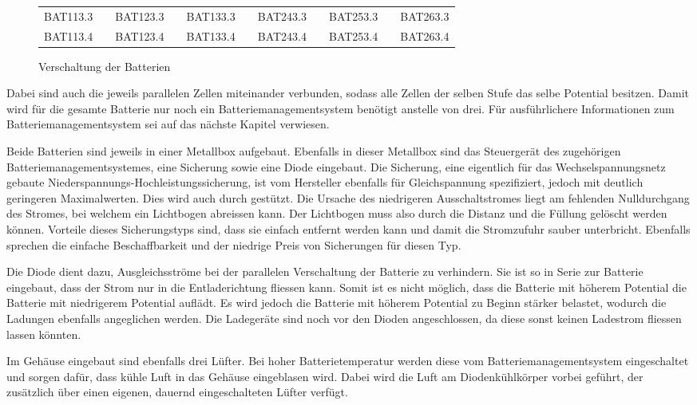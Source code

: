 \begin{figure}[h]
\begin{tabular}{lp{2mm}lp{2mm}lp{1.5cm}lp{2mm}lp{2mm}l}
\multicolumn{1}{|l|}{BAT113.3} & \multicolumn{1}{l|}{} & \multicolumn{1}{l|}{BAT123.3} & \multicolumn{1}{l|}{} & \multicolumn{1}{l|}{BAT133.3} & \multicolumn{1}{l|}{} & \multicolumn{1}{l|}{BAT243.3} & \multicolumn{1}{l|}{} & \multicolumn{1}{l|}{BAT253.3} & \multicolumn{1}{l|}{} & \multicolumn{1}{l|}{BAT263.3} \\ \cline{1-1} \cline{3-3} \cline{5-5} \cline{7-7} \cline{9-9} \cline{11-11} 
\multicolumn{1}{|l|}{BAT113.4} & \multicolumn{1}{l|}{} & \multicolumn{1}{l|}{BAT123.4} & \multicolumn{1}{l|}{} & \multicolumn{1}{l|}{BAT133.4} & \multicolumn{1}{l|}{} & \multicolumn{1}{l|}{BAT243.4} & \multicolumn{1}{l|}{} & \multicolumn{1}{l|}{BAT253.4} & \multicolumn{1}{l|}{} & \multicolumn{1}{l|}{BAT263.4} \\ \cline{1-1} \cline{3-3} \cline{5-5} \cline{7-7} \cline{9-9} \cline{11-11} 
\end{tabular}
	\caption{Verschaltung der Batterien}
	\label{fig:schema_batterie}
\end{figure}

Dabei sind auch die jeweils parallelen Zellen miteinander verbunden, sodass alle Zellen der selben Stufe das selbe Potential besitzen. Damit wird für die gesamte Batterie nur noch ein Batteriemanagementsystem benötigt anstelle von drei. Für ausführlichere Informationen zum Batteriemanagementsystem sei auf das nächste Kapitel verwiesen.

Beide Batterien sind jeweils in einer Metallbox aufgebaut. Ebenfalls in dieser Metallbox sind das Steuergerät des zugehörigen Batteriemanagementsystemes, eine Sicherung sowie eine Diode eingebaut. Die Sicherung, eine eigentlich für das Wechselspannungsnetz gebaute Niederspannungs-Hochleistungssicherung, ist vom Hersteller ebenfalls für Gleichspannung spezifiziert, jedoch mit deutlich geringeren Maximalwerten. Dies wird auch durch \cite{siba} gestützt. Die Ursache des niedrigeren Ausschaltstromes liegt am fehlenden Nulldurchgang des Stromes, bei welchem ein Lichtbogen abreissen kann. Der Lichtbogen muss also durch die Distanz und die Füllung gelöscht werden können. Vorteile dieses Sicherungstyps sind, dass sie einfach entfernt werden kann und damit die Stromzufuhr sauber unterbricht. Ebenfalls sprechen die einfache Beschaffbarkeit und der niedrige Preis von Sicherungen für diesen Typ.

Die Diode dient dazu, Ausgleichsströme bei der parallelen Verschaltung der Batterie zu verhindern. Sie ist so in Serie zur Batterie eingebaut, dass der Strom nur in die Entladerichtung fliessen kann. Somit ist es nicht möglich, dass die Batterie mit höherem Potential die Batterie mit niedrigerem Potential auflädt. Es wird jedoch die Batterie mit höherem Potential zu Beginn stärker belastet, wodurch die Ladungen ebenfalls angeglichen werden. Die Ladegeräte sind noch vor den Dioden angeschlossen, da diese sonst keinen Ladestrom fliessen lassen könnten.

Im Gehäuse eingebaut sind ebenfalls drei Lüfter. Bei hoher Batterietemperatur werden diese vom Batteriemanagementsystem eingeschaltet und sorgen dafür, dass kühle Luft in das Gehäuse eingeblasen wird. Dabei wird die Luft am Diodenkühlkörper vorbei geführt, der zusätzlich über einen eigenen, dauernd eingeschalteten Lüfter verfügt.